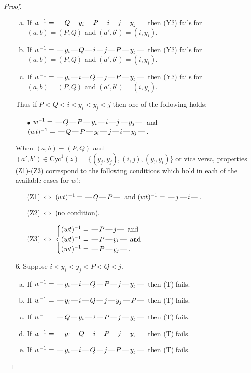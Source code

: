 \documentclass[10pt]{article}
\theoremstyle{definition}
\theoremstyle{definition}
\def\dash{\text{\hspace{0.5mm}---\hspace{0.5mm}}}
\def\Cyc{\mathrm{Cyc}}
\begin{document}
\begin{proof}
\begin{enumerate}
\begin{enumerate}[(a)]
\item If $w^{-1} = \dash Q\dash y_i\dash P\dash i\dash j\dash y_j\dash $ then (Y3) fails for $(a,b)=(P,Q)$ and $(a',b')=(i,y_i)$.
\item If $w^{-1} = \dash y_i\dash Q\dash i\dash j\dash P\dash y_j\dash $ then (Y3) fails for $(a,b)=(P,Q)$ and $(a',b')=(i,y_i)$.
\item If $w^{-1} = \dash y_i\dash i\dash Q\dash j\dash P\dash y_j\dash $ then (Y3) fails for $(a,b)=(P,Q)$ and $(a',b')=(i,y_i)$.
\end{enumerate}
Thus if $P < Q < i < y_i < y_j < j$ then one of the following holds:
\begin{enumerate}
\item[$\bullet$] $w^{-1} = \dash Q\dash P\dash y_i\dash i\dash j\dash y_j\dash $ and $(wt)^{-1} = \dash Q\dash P\dash y_i\dash j\dash i\dash y_j\dash $.
\end{enumerate}
When $(a,b)= (P,Q)$ and $(a',b')\in \Cyc^1(z)=\{(y_j,y_j),(i,j),(y_i,y_i)\}$ or vice versa,
properties (Z1)-(Z3) correspond to the following conditions which
hold in each of the available cases for $wt$:
\begin{enumerate}
\item[](Z1) $\Leftrightarrow$ $(wt)^{-1} = \dash Q \dash P \dash$  and $(wt)^{-1} = \dash j \dash i \dash$.
\item[](Z2) $\Leftrightarrow$ (no condition).
\item[](Z3) $\Leftrightarrow$ $\begin{cases}\text{$(wt)^{-1} = \dash P \dash j \dash$}\text{ and }\\
\text{$(wt)^{-1} = \dash P \dash y_i \dash$}\text{ and }\\
\text{$(wt)^{-1} = \dash P \dash y_j \dash$}.\end{cases}$
\end{enumerate}
\item[$6$.] Suppose $i < y_i < y_j < P < Q < j$.
\begin{enumerate}[(a)]
\item If $w^{-1} = \dash y_i\dash i\dash Q\dash P\dash j\dash y_j\dash $ then (T) fails.
\item If $w^{-1} = \dash y_i\dash i\dash Q\dash j\dash y_j\dash P\dash $ then (T) fails.
\item If $w^{-1} = \dash Q\dash y_i\dash i\dash P\dash j\dash y_j\dash $ then (T) fails.
\item If $w^{-1} = \dash y_i\dash Q\dash i\dash P\dash j\dash y_j\dash $ then (T) fails.
\item If $w^{-1} = \dash y_i\dash i\dash Q\dash j\dash P\dash y_j\dash $ then (T) fails.

\end{enumerate}
\end{enumerate}
\end{proof}
\end{document}
